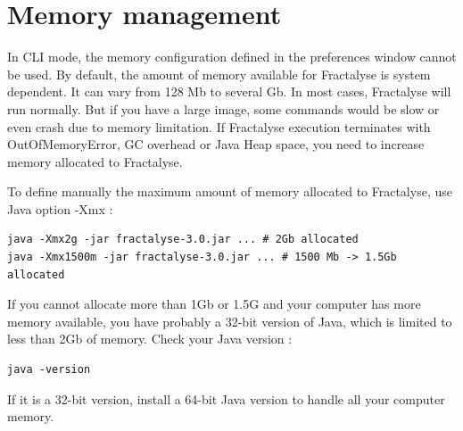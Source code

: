 \documentclass[a4paper,10pt]{report}
\begin{document}
\section{Memory management}
In CLI mode, the memory configuration defined in the preferences window cannot be used.
By default, the amount of memory available for Fractalyse is system dependent. It can vary from 128 Mb to several Gb.
In most cases, Fractalyse will run normally. But if you have a large image, some commands would be slow or even crash due to memory limitation.
If Fractalyse execution terminates with OutOfMemoryError, GC overhead or Java Heap space, you need to increase memory allocated to Fractalyse.

To define manually the maximum amount of memory allocated to Fractalyse, use Java option -Xmx :
\begin{Verbatim}
java -Xmx2g -jar fractalyse-3.0.jar ... # 2Gb allocated
java -Xmx1500m -jar fractalyse-3.0.jar ... # 1500 Mb -> 1.5Gb allocated
\end{Verbatim}
If you cannot allocate more than 1Gb or 1.5G and your computer has more memory available, you have probably a
 32-bit version of Java, which is limited to less than 2Gb of memory.
Check your Java version :
\begin{Verbatim}
java -version
\end{Verbatim}
If it is a 32-bit version, install a 64-bit Java version to handle all your computer memory.
\end{document}
